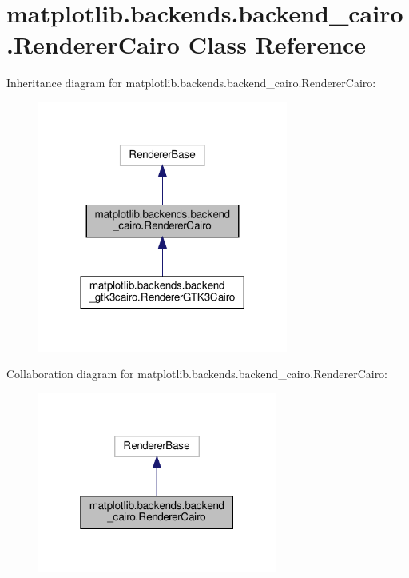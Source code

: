 \hypertarget{classmatplotlib_1_1backends_1_1backend__cairo_1_1RendererCairo}{}\section{matplotlib.\+backends.\+backend\+\_\+cairo.\+Renderer\+Cairo Class Reference}
\label{classmatplotlib_1_1backends_1_1backend__cairo_1_1RendererCairo}


Inheritance diagram for matplotlib.\+backends.\+backend\+\_\+cairo.\+Renderer\+Cairo\+:
\nopagebreak
\begin{figure}[H]
\begin{center}
\leavevmode
\includegraphics[width=233pt]{classmatplotlib_1_1backends_1_1backend__cairo_1_1RendererCairo__inherit__graph}
\end{center}
\end{figure}


Collaboration diagram for matplotlib.\+backends.\+backend\+\_\+cairo.\+Renderer\+Cairo\+:
\nopagebreak
\begin{figure}[H]
\begin{center}
\leavevmode
\includegraphics[width=223pt]{classmatplotlib_1_1backends_1_1backend__cairo_1_1RendererCairo__coll__graph}
\end{center}
\end{figure}
